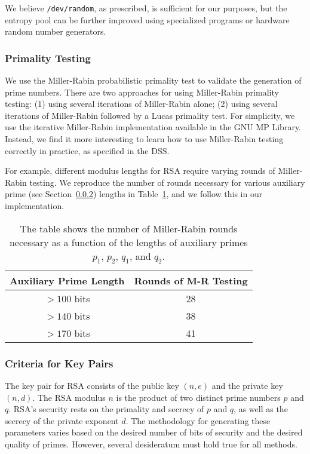 \documentclass[a4paper]{article}
\begin{document}
We believe {\tt /dev/random}, as prescribed, is sufficient for our purposes, but the entropy pool can be further improved using specialized programs or hardware random number generators.

\subsubsection{Primality Testing}

We use the Miller-Rabin probabilistic primality test to validate the generation of prime numbers. There are two approaches for using Miller-Rabin primality testing: (1) using several iterations of Miller-Rabin alone; (2) using several iterations of Miller-Rabin followed by a Lucas primality test. For simplicity, we use the iterative Miller-Rabin implementation available in the GNU MP Library. Instead, we find it more interesting to learn how to use Miller-Rabin testing correctly
in practice, as specified in the DSS.

For example, different modulus lengths for RSA require varying rounds of Miller-Rabin testing. We reproduce the number of rounds necessary for various auxiliary prime (see Section~\ref{sec:keygen}) lengths in Table~\ref{tab:mr}, and we follow this in our implementation.

\begin{table}[h]
\centering
\begin{tabular}{|c|c|} 
 \hline
 Auxiliary Prime Length & Rounds of M-R Testing  \\ \hline
 $>100$ bits & 28 \\ 
 $>140$ bits & 38 \\ 
 $>170$ bits & 41 \\
 \hline
\end{tabular}
\caption{The table shows the number of Miller-Rabin rounds necessary as a function of the lengths of auxiliary primes $p_1$, $p_2$, $q_1$, and $q_2$.}
\label{tab:mr}
\end{table}



\subsubsection{Criteria for Key Pairs}\label{sec:keygen}

The key pair for RSA consists of the public key $(n, e)$ and the private key $(n, d)$. The RSA modulus $n$ is the product of two distinct prime numbers $p$ and $q$. RSA's security rests on the primality and secrecy of $p$ and $q$, as well as the secrecy of the private exponent $d$. The methodology for generating these parameters varies based on the desired number of bits of security and the desired quality of primes. However, several desideratum must hold true for all
methods.\newline
\end{document}
